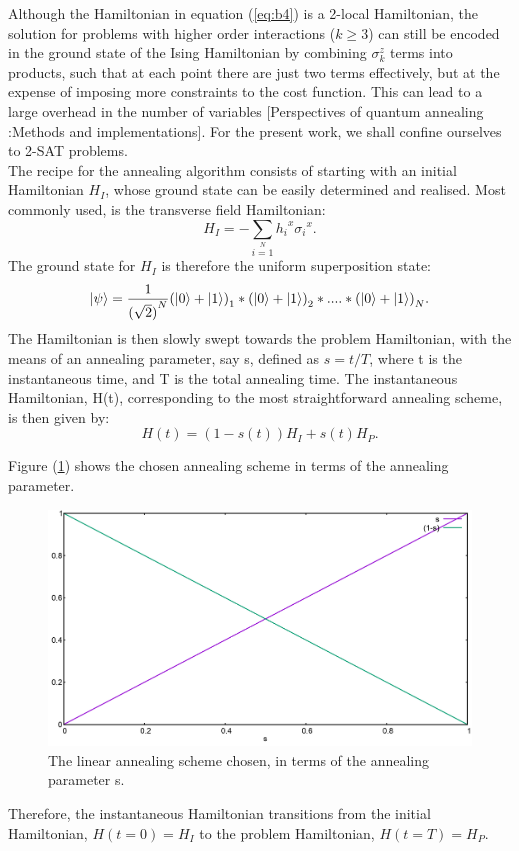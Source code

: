 \documentclass[12]{article}
\begin{document}
Although the Hamiltonian in equation (\ref{eq:b4}) is a 2-local Hamiltonian, the solution for problems with higher order interactions ($k \geq 3$) can still be encoded in the ground state of the Ising Hamiltonian by combining $\sigma_k^z$ terms into products, such that at each point there are just two terms effectively, but at the expense of imposing more constraints to the cost function. This can lead to a large overhead in the number of variables [Perspectives of quantum annealing :Methods and implementations]. For the present work, we shall confine ourselves to 2-SAT problems. \\

The recipe for the annealing algorithm consists of starting with an initial Hamiltonian $H_I$, whose ground state can be easily determined and realised. Most commonly used, is the transverse field Hamiltonian: 
\begin{equation}
H_I=-\sum\limits_{i=1}\limits^{N}{h_i}^x{\sigma_i}^x. \label{eq:b5}
\end{equation}
The ground state for $H_I$ is therefore the uniform superposition state: 
\begin{equation}
\ket{\psi}=\frac{1}{{(\sqrt{2})}^N}{(\ket{0}+\ket{1})}_1*{(\ket{0}+\ket{1})}_2*....*{(\ket{0}+\ket{1})}_N. \label{eq:b6}
\end{equation}
The Hamiltonian is then slowly swept towards the problem Hamiltonian, with the means of an annealing parameter, say s, defined as $s=t/T$, where t is the instantaneous time, and T is the total annealing time. The instantaneous Hamiltonian, H(t), corresponding to the most straightforward annealing scheme, is then given by: 
\begin{equation}
H(t)= (1-s(t))H_I + s(t)H_P. \label{eq:b7}
\end{equation}

Figure (\ref{fig:b1}) shows the chosen annealing scheme in terms of the annealing parameter.
\begin{figure}[H]
\centering 
\includegraphics[scale=0.3]{Scheme.png}
\caption{The linear annealing scheme chosen, in terms of the annealing parameter s.}
\label{fig:b1}
\end{figure}
Therefore, the instantaneous Hamiltonian transitions from the initial Hamiltonian, $H(t=0)=H_I$ to the problem Hamiltonian, $H(t=T)=H_P$. \\
\end{document}
